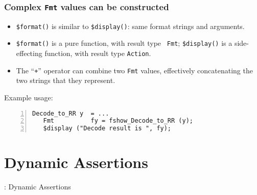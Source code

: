 
\begin{frame}[fragile]
\frametitle{Complex {\tt Fmt} values can be constructed}

\footnotesize

\begin{minipage}{0.55\textwidth}
\end{minipage}
\hfill
\begin{minipage}{0.43\textwidth}
  \begin{itemize}

    \item {\tt \$format()} is similar to {\tt \$display()}: same
        format strings and arguments.

    \item {\tt \$format()} is a pure function, with result type {\tt
        Fmt}; {\tt \$display()} is a side-effecting function, with
        result type {\tt Action}.

    \item The ``{\tt +}'' operator can combine two {\tt Fmt} values,
        effectively concatenating the two strings that they represent.

  \end{itemize}

  \vx

  Example usage:
{\scriptsize
\begin{Verbatim}[frame=single, numbers=left]
   Decode_to_RR y  = ...
   Fmt          fy = fshow_Decode_to_RR (y);
   $display ("Decode result is ", fy);
\end{Verbatim}
}

\end{minipage}

\end{frame}


\section{Dynamic Assertions}

\begin{frame}

\begin{center}
  {\LARGE {\BSV}: Dynamic Assertions}
\end{center}

\end{frame}

